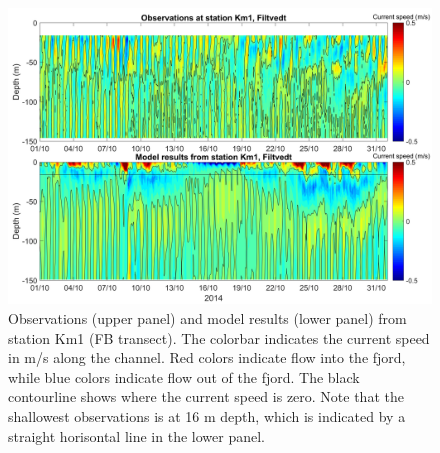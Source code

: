 \begin{figure}[htb]
	\centerline{
		\includegraphics*[trim=0 0 0 0,clip=true,width=\textwidth]{Figurer/AndreS/Km1_Obs_vs_Mod_v2}}
	\caption{\small Observations (upper panel) and model results (lower panel) from station Km1 (FB transect). The colorbar indicates the current speed in m/s along the channel. Red colors indicate flow into the fjord, while blue colors indicate flow out of the fjord. The black contourline shows where the current speed is zero. Note that the shallowest observations is at 16 m depth, which is indicated by a straight horisontal line in the lower panel.}
	\label{fig:Km1}
\end{figure}

